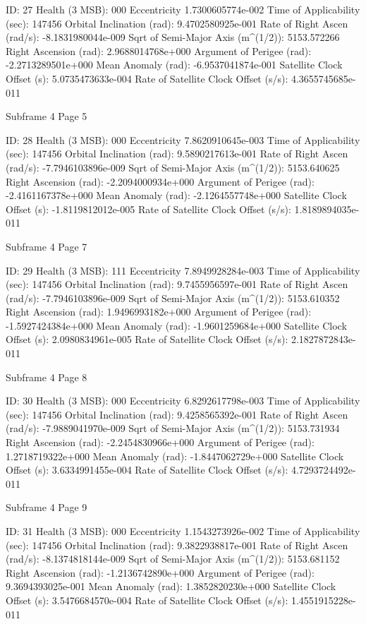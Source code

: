  ID:				     27
 Health (3 MSB):		     000
 Eccentricity			     1.7300605774e-002
 Time of Applicability (sec):	       147456
 Orbital Inclination (rad):	     9.4702580925e-001
 Rate of Right Ascen (rad/s):	     -8.1831980044e-009
 Sqrt of Semi-Major Axis (m^(1/2)):  5153.572266
 Right Ascension (rad): 	     2.9688014768e+000
 Argument of Perigee (rad):	     -2.2713289501e+000
 Mean Anomaly (rad):		     -6.9537041874e-001
 Satellite Clock Offset (s):	     5.0735473633e-004
 Rate of Satellite Clock Offset (s/s): 4.3655745685e-011

 Subframe  4 Page  5

 ID:				     28
 Health (3 MSB):		     000
 Eccentricity			     7.8620910645e-003
 Time of Applicability (sec):	       147456
 Orbital Inclination (rad):	     9.5890217613e-001
 Rate of Right Ascen (rad/s):	     -7.7946103896e-009
 Sqrt of Semi-Major Axis (m^(1/2)):  5153.640625
 Right Ascension (rad): 	     -2.2094000934e+000
 Argument of Perigee (rad):	     -2.4161167378e+000
 Mean Anomaly (rad):		     -2.1264557748e+000
 Satellite Clock Offset (s):	     -1.8119812012e-005
 Rate of Satellite Clock Offset (s/s): 1.8189894035e-011

 Subframe  4 Page  7

 ID:				     29
 Health (3 MSB):		     111
 Eccentricity			     7.8949928284e-003
 Time of Applicability (sec):	       147456
 Orbital Inclination (rad):	     9.7455956597e-001
 Rate of Right Ascen (rad/s):	     -7.7946103896e-009
 Sqrt of Semi-Major Axis (m^(1/2)):  5153.610352
 Right Ascension (rad): 	     1.9496993182e+000
 Argument of Perigee (rad):	     -1.5927424384e+000
 Mean Anomaly (rad):		     -1.9601259684e+000
 Satellite Clock Offset (s):	     2.0980834961e-005
 Rate of Satellite Clock Offset (s/s): 2.1827872843e-011

 Subframe  4 Page  8

 ID:				     30
 Health (3 MSB):		     000
 Eccentricity			     6.8292617798e-003
 Time of Applicability (sec):	       147456
 Orbital Inclination (rad):	     9.4258565392e-001
 Rate of Right Ascen (rad/s):	     -7.9889041970e-009
 Sqrt of Semi-Major Axis (m^(1/2)):  5153.731934
 Right Ascension (rad): 	     -2.2454830966e+000
 Argument of Perigee (rad):	     1.2718719322e+000
 Mean Anomaly (rad):		     -1.8447062729e+000
 Satellite Clock Offset (s):	     3.6334991455e-004
 Rate of Satellite Clock Offset (s/s): 4.7293724492e-011

 Subframe  4 Page  9

 ID:				     31
 Health (3 MSB):		     000
 Eccentricity			     1.1543273926e-002
 Time of Applicability (sec):	       147456
 Orbital Inclination (rad):	     9.3822938817e-001
 Rate of Right Ascen (rad/s):	     -8.1374818144e-009
 Sqrt of Semi-Major Axis (m^(1/2)):  5153.681152
 Right Ascension (rad): 	     -1.2136742890e+000
 Argument of Perigee (rad):	     9.3694393025e-001
 Mean Anomaly (rad):		     1.3852820230e+000
 Satellite Clock Offset (s):	     3.5476684570e-004
 Rate of Satellite Clock Offset (s/s): 1.4551915228e-011

